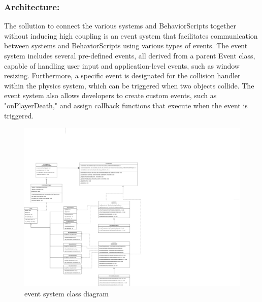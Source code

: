 \documentclass{projdoc}
\begin{document}
\subsubsection{Architecture:}
The sollution to connect the various systems and BehaviorScripts together without inducing high coupling is an event system that facilitates communication between systems and BehaviorScripts using various types of events.
The event system includes several pre-defined events, all derived from a parent Event class, capable of handling user input and application-level events, such as window resizing.
Furthermore, a specific event is designated for the collision handler within the physics system, which can be triggered when two objects collide.
The event system also allows developers to create custom events, such as "onPlayerDeath," and assign callback functions that execute when the event is triggered.
\begin{figure}
    \centering
    \includegraphics[width=\linewidth]{img/event-uml.drawio.png}
    \caption{event system class diagram}
    \label{fig:event-uml}
\end{figure}
\end{document}
